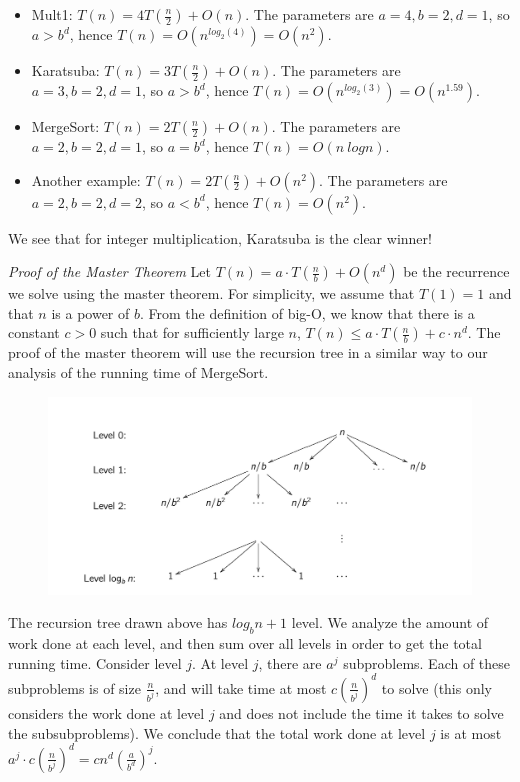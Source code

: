 \documentclass [12pt]{article}
\begin{document}
\begin{itemize}
    \item Mult1: $T(n) = 4T(\frac{n}{2})+ O(n)$. The parameters are $a = 4, b = 2, d = 1$, so $a > b^d$, hence $T(n) = O(n^{log_2(4)}) = O(n^2)$.
    \item Karatsuba: $T(n) = 3T(\frac{n}{2})+ O(n)$. The parameters are $a = 3, b = 2, d = 1$, so $a > b^d$, hence $T(n) = O(n^{log_2(3)}) = O(n^{1.59})$.
    \item MergeSort: $T(n) = 2T(\frac{n}{2})+ O(n)$. The parameters are $a = 2, b = 2, d = 1$, so $a = b^d$, hence $T(n) = O(n\ log n)$.
    \item Another example: $T(n) = 2T(\frac{n}{2})+ O(n^2)$. The parameters are $a = 2, b = 2, d = 2$, so $a < b^d$, hence $T(n) = O(n^2)$.
\end{itemize}
We see that for integer multiplication, Karatsuba is the clear winner!

\textit{Proof of the Master Theorem} Let $T(n) = a\cdot T(\frac{n}{b})+ O(n^d)$ be the recurrence we solve using the master theorem. For simplicity, we assume that $T(1) = 1$ and that $n$ is a power of $b$. From the definition of big-O, we know that there is a constant $c > 0$ such that for sufficiently large $n$, $T(n) \leq a\cdot T(\frac{n}{b})+ c\cdot n^d$. The proof of the master theorem will use the recursion tree in a similar way to our analysis of the running time of MergeSort.

\begin{figure}[h!]
\centering
\includegraphics[scale=0.75]{master_theorem_proof.png}
\end{figure}

The recursion tree drawn above has $log_b n + 1$ level. We analyze the amount of work done at each level, and then sum over all levels in order to get the total running time. Consider level $j$. At level $j$, there are $a^j$ subproblems. Each of these subproblems is of size $\frac{n}{b^j}$, and will take time at most $c\left(\frac{n}{b^j}\right)^d$ to solve (this only considers the work done at level $j$ and does not include the time it takes to solve the subsubproblems). We conclude that the total work done at level $j$ is at most $a^j \cdot c\left(\frac{n}{b^j}\right)^d= cn^d\left(\frac{a}{b^d}\right)^j$.
\end{document}
